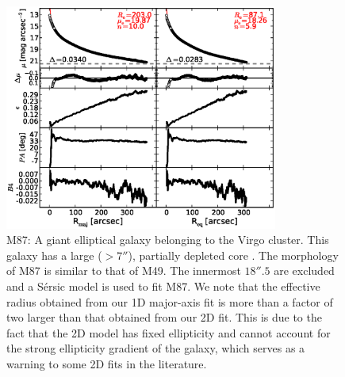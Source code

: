 \documentclass[preprint2]{emulateapj}
\newcommand{\fitfigurewidth}{0.8\textwidth}
\begin{document}
  \begin{figure}[h]
  \begin{center}
  \includegraphics[width=\fitfigurewidth]{m87_1Dfit.eps}
  \caption{M87:
  A giant elliptical galaxy belonging to the Virgo cluster.
  This galaxy has a large ($> 7''$), partially depleted core \citep{ferrarese2006acsvcs}.
  The morphology of M87 is similar to that of M49.
  The innermost $18''.5$ are excluded and
  a S\'ersic model is used to fit M87. 
  We note that the effective radius obtained from our 1D major-axis fit is more than a factor of two larger than that obtained from our 2D fit.
  This is due to the fact that the 2D model has fixed ellipticity and cannot account for the strong ellipticity gradient of the galaxy, 
  which serves as a warning to some 2D fits in the literature.  
  }
  \end{center}
  \end{figure}
\end{document}
